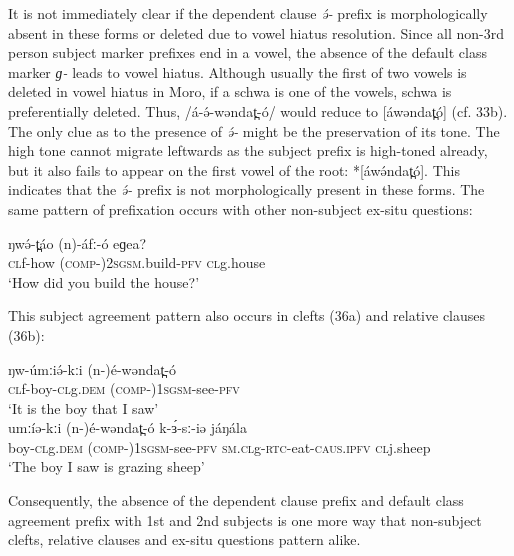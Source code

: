 It is not immediately clear if the dependent clause \textit{ə́-} prefix is morphologically absent in these forms or deleted due to vowel hiatus resolution. Since all non-3rd person subject marker prefixes end in a vowel, the absence of the default class marker \textit{ɡ-} leads to vowel hiatus. Although usually the first of two vowels is deleted in vowel hiatus in Moro, if a schwa is one of the vowels, schwa is preferentially deleted.  Thus, /á-ə́-wəndat̪-ó/ would reduce to [áwəndat̪ó] (cf. 33b). The only clue as to the presence of \textit{ə́-} might be the preservation of its tone. The high tone cannot migrate leftwards as the subject prefix is high-toned already, but it also fails to appear on the first vowel of the root:  *[áwə́ndat̪ó]. This indicates that the \textit{ə́-} prefix is not morphologically present in these forms.
The same pattern of prefixation occurs with other non-subject ex-situ questions:

\ea
\gll	ŋwə́-t̪áo	(n)-áfː-ó	eɡea?\\
	\textsc{cl}f-how	(\textsc{comp-})2\textsc{sgsm}.build-\textsc{pfv}	\textsc{cl}g.house\\
\trans	‘How did you build the house?’
\z

This subject agreement pattern also occurs in clefts (36a) and relative clauses (36b):

\ea
\ea \gll ŋw-úmːiə́-kːi	(n-)é-wəndat̪-ó				\\
	\textsc{cl}f-boy-\textsc{cl}g.\textsc{dem}	(\textsc{comp-})1\textsc{sgsm}-see-\textsc{pfv}\\
\trans		‘It is the boy that I saw’\\
\gll	umːíə-kːi	(n-)é-wəndat̪-ó	k-ɜ́-sː-iə             	jáŋála  \\
		boy-\textsc{cl}g.\textsc{dem}	(\textsc{comp-})1\textsc{sgsm}-see-\textsc{pfv}	\textsc{sm.cl}g-\textsc{rtc}-eat-\textsc{caus}.\textsc{ipfv}	\textsc{cl}j.sheep\\
\trans	‘The boy I saw is grazing sheep’\\
\z
\z

Consequently, the absence of the dependent clause prefix and default class agreement prefix with 1st and 2nd subjects is one more way that non-subject clefts, relative clauses and ex-situ questions pattern alike.

